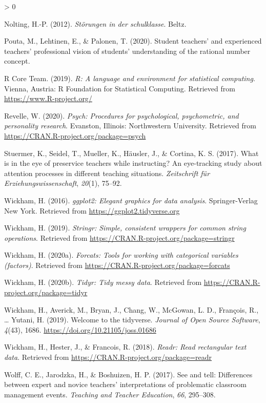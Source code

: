 \documentclass[
  english,
  man,floatsintext]{apa6}
\newlength{\cslhangindent}
\newenvironment{CSLReferences}[2] %
 {%
  \setlength{\parindent}{0pt}
  \ifodd #1 \everypar{\setlength{\hangindent}{\cslhangindent}}\ignorespaces\fi
  \ifnum #2 > 0
  \setlength{\parskip}{#2\baselineskip}
  \fi
 }%
 {}
\begin{document}
\begin{CSLReferences}{1}{0}
\leavevmode\hypertarget{ref-nolting2012storungen}{}%
Nolting, H.-P. (2012). \emph{St{ö}rungen in der schulklasse}. Beltz.

\leavevmode\hypertarget{ref-pouta2020student}{}%
Pouta, M., Lehtinen, E., \& Palonen, T. (2020). Student teachers' and experienced teachers' professional vision of students' understanding of the rational number concept.

\leavevmode\hypertarget{ref-R-base}{}%
R Core Team. (2019). \emph{R: A language and environment for statistical computing}. Vienna, Austria: R Foundation for Statistical Computing. Retrieved from \url{https://www.R-project.org/}

\leavevmode\hypertarget{ref-R-psych}{}%
Revelle, W. (2020). \emph{Psych: Procedures for psychological, psychometric, and personality research}. Evanston, Illinois: Northwestern University. Retrieved from \url{https://CRAN.R-project.org/package=psych}

\leavevmode\hypertarget{ref-stuermer2017eye}{}%
Stuermer, K., Seidel, T., Mueller, K., Häusler, J., \& Cortina, K. S. (2017). What is in the eye of preservice teachers while instructing? An eye-tracking study about attention processes in different teaching situations. \emph{Zeitschrift f{ü}r Erziehungswissenschaft}, \emph{20}(1), 75--92.

\leavevmode\hypertarget{ref-R-ggplot2}{}%
Wickham, H. (2016). \emph{ggplot2: Elegant graphics for data analysis}. Springer-Verlag New York. Retrieved from \url{https://ggplot2.tidyverse.org}

\leavevmode\hypertarget{ref-R-stringr}{}%
Wickham, H. (2019). \emph{Stringr: Simple, consistent wrappers for common string operations}. Retrieved from \url{https://CRAN.R-project.org/package=stringr}

\leavevmode\hypertarget{ref-R-forcats}{}%
Wickham, H. (2020a). \emph{Forcats: Tools for working with categorical variables (factors)}. Retrieved from \url{https://CRAN.R-project.org/package=forcats}

\leavevmode\hypertarget{ref-R-tidyr}{}%
Wickham, H. (2020b). \emph{Tidyr: Tidy messy data}. Retrieved from \url{https://CRAN.R-project.org/package=tidyr}

\leavevmode\hypertarget{ref-R-tidyverse}{}%
Wickham, H., Averick, M., Bryan, J., Chang, W., McGowan, L. D., François, R., \ldots{} Yutani, H. (2019). Welcome to the {tidyverse}. \emph{Journal of Open Source Software}, \emph{4}(43), 1686. \url{https://doi.org/10.21105/joss.01686}

\leavevmode\hypertarget{ref-R-readr}{}%
Wickham, H., Hester, J., \& Francois, R. (2018). \emph{Readr: Read rectangular text data}. Retrieved from \url{https://CRAN.R-project.org/package=readr}

\leavevmode\hypertarget{ref-wolff2017see}{}%
Wolff, C. E., Jarodzka, H., \& Boshuizen, H. P. (2017). See and tell: Differences between expert and novice teachers' interpretations of problematic classroom management events. \emph{Teaching and Teacher Education}, \emph{66}, 295--308.

\end{CSLReferences}

\endgroup
\end{document}
